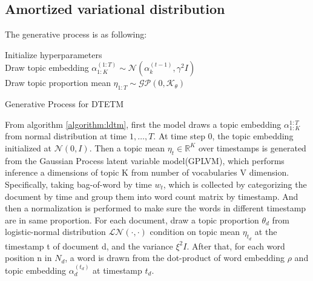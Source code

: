 \subsection{Amortized variational distribution}
The generative process is as following:\\
\begin{algorithm}[H]
Initialize hyperparameters\\
Draw topic embedding $ \alpha_{1:K}^{(1:T)}\sim\mathcal{N}(\alpha_k^{(t-1)},\gamma^2I) $\\
Draw topic proportion mean $ \eta_{1:T}\sim\mathcal{GP}(0,\mathcal{K_\theta}) $\\
\caption{Generative Process for DTETM}
\label{algorithm:ldtm}
\end{algorithm}
From algorithm \ref{algorithm:ldtm}, first the model draws a topic embedding $ \alpha_{1:K}^{1:T} $ from normal distribution at time $ 1,\dots,T $. At time step 0, the topic embedding initialized at $ \mathcal{N}(0,I) $.
Then a topic mean $ \eta_t\in\mathbb{R}^{K} $ over timestamps is generated from the Gaussian Process latent variable model(GPLVM), which performs inference a dimensions of topic K from number of vocabularies V dimension. Specifically, taking bag-of-word by time $ w_t $, which is collected by categorizing the document by time and group them into word count matrix by timestamp. And then a normalization is performed to make sure the words in different timestamp are in same proportion.
For each document, draw a topic proportion $ \theta_{d} $ from logistic-normal distribution $ \mathcal{LN}(\cdot,\cdot) $ condition on topic mean $ \eta_{t_d} $ at the timestamp t of document d, and the variance $ \xi^2I $.
After that, for each word position n in $ N_d $, a word is drawn from the dot-product of word embedding $ \rho $ and topic embedding $ \alpha^{(t_d)}_{d} $ at timestamp $ t_d $. 
